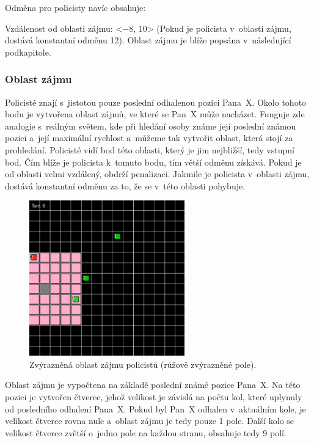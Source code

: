 Odměna pro policisty navíc obsahuje:
\begin{myitemize}
  \item Vzdálenost od oblasti zájmu: <$\minus$8, 10> (Pokud je policista v~oblasti zájmu, dostává konstantní odměnu 12).
  Oblast zájmu je blíže popsána v~následující podkapitole.
\end{myitemize}

\subsubsection{Oblast zájmu}
\label{subsubsec:oblast_zajmu}

Policisté znají s~jistotou pouze poslední odhalenou pozici Pana~X\@.
Okolo tohoto bodu je vytvořena oblast zájmů, ve které se Pan~X může nacházet.
Funguje zde analogie s~reálným světem, kde při hledání osoby známe její poslední známou pozici a~její maximální rychlost a~můžeme tak vytvořit oblast, která stojí za prohledání.
Policisté vidí bod této oblasti, který je jim nejbližší, tedy vstupní bod.
Čím blíže je policista k~tomuto bodu, tím větší odměnu získává.
Pokud je od oblasti velmi vzdálený, obdrží penalizaci.
Jakmile je policista v~oblasti zájmu, dostává konstantní odměnu za to, že se v~této oblasti pohybuje.

\begin{figure}[H]
	\centering
	\includegraphics[width=0.6\textwidth]{obrazky-figures/interest_area}
      \caption{Zvýrazněná oblast zájmu policistů (růžově zvýrazněné pole).}
    \label{fig:game_11}
\end{figure}

Oblast zájmu je vypočtena na základě poslední známé pozice Pana~X\@.
Na této pozici je vytvořen čtverec, jehož velikost je závislá na počtu kol, které uplynuly od posledního odhalení Pana~X\@.
Pokud byl Pan~X odhalen v~aktuálním kole, je velikost čtverce rovna nule a~oblast zájmu je tedy pouze 1 pole.
Další kolo se velikost čtverce zvětší o~jedno pole na každou stranu, obsahuje tedy 9 polí.

